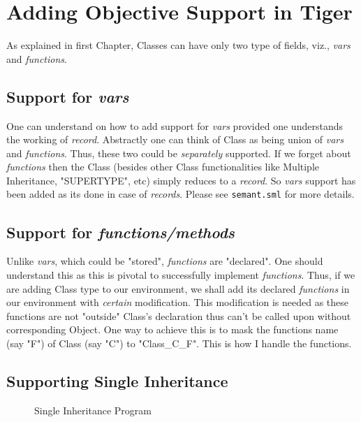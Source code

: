 \chapter{Adding Objective Support in Tiger}

As explained in first Chapter, Classes can have only two type of fields, viz., \textit{vars} and \textit{functions}.

\section{Support for \textit{vars}}

One can understand on how to add support for \textit{vars} provided one understands the working of \textit{record}. Abstractly one can think of Class as being union of \textit{vars} and \textit{functions}. Thus, these two could be \textit{separately} supported. If we forget about \textit{functions} then the Class (besides other Class functionalities like Multiple Inheritance, "SUPERTYPE", etc) simply reduces to a \textit{record}. So \textit{vars} support has been added as its done in case of \textit{records}. Please see \texttt{semant.sml} for more details.

\section{Support for \textit{functions/methods}}

Unlike \textit{vars}, which could be "stored", \textit{functions} are "declared". One should understand this as this is pivotal to successfully implement \textit{functions}. Thus, if we are adding Class type to our environment, we shall add its declared \textit{functions} in our environment with \textit{certain} modification. This modification is needed as these functions are not "outside" Class's declaration thus can't be called upon without corresponding Object. One way to achieve this is to mask the functions name (say "F") of Class (say "C") to "Class\_C\_F". This is how I handle the functions.

\section{Supporting Single Inheritance}

\begin{figure}
	\centering
	\caption{Single Inheritance Program}
	\label{fig:SI1}
\end{figure}

